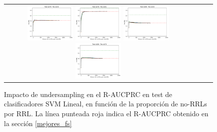 \begin{figure}[h!]
\begin{tabular}{cccc}
\includegraphics[width=0.25\textwidth]{Kap7/train=b278_test=b234_linear_individual_curves.png}  \includegraphics[width=0.25\textwidth]{Kap7/train=b278_test=b261_linear_individual_curves.png} 
 \includegraphics[width=0.25\textwidth]{Kap7/train=b360_test=b234_linear_individual_curves.png}  \includegraphics[width=0.25\textwidth]{Kap7/train=b360_test=b278_linear_individual_curves.png} 
\end{tabular}
\caption{Impacto de undersampling en el R-AUCPRC en test de clasificadores SVM Lineal, en función de la proporción de no-RRLs por RRL. La línea punteada roja indica el R-AUCPRC obtenido en la sección \protect\ref{mejores_fs}}
\label{fig:svml_undersample}
\end{figure}

